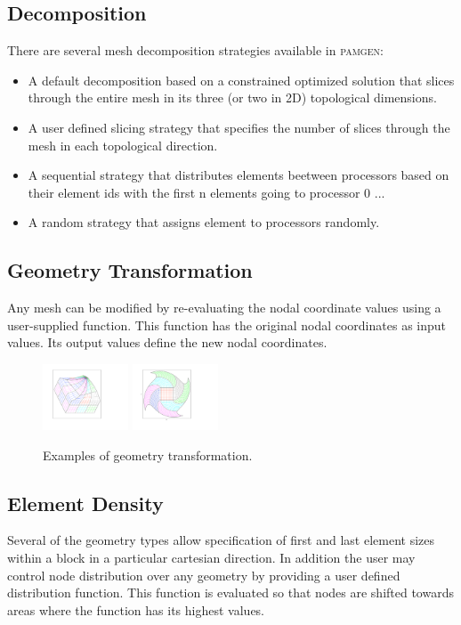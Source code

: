 \subsection{Decomposition}
There are several mesh decomposition strategies available in \textsc{pamgen}:
\begin{itemize}\addtolength{\itemsep}{-0.5\baselineskip}
\item A default decomposition based on a constrained optimized solution that slices through the entire mesh in its three (or two in 2D) topological dimensions.
\item A user defined slicing strategy that specifies the number of slices through the mesh in each topological direction.
\item A sequential strategy that distributes elements beetween processors based on their element ids with the first n  elements going to processor 0 ...
\item A random strategy that assigns element to processors randomly.
\end{itemize}

\subsection {Geometry Transformation}
Any mesh can be modified by re-evaluating the nodal coordinate values using a user-supplied function. This function has the original nodal coordinates as input values. Its output values define the new nodal coordinates.



\begin{figure}[h]
    \centering
      \includegraphics[width=1.0in]{3d_warped_geometry_white_bg}
      \includegraphics[width=1.0in]{mesh_warp_2d_white_bg}
  \caption{Examples of geometry transformation.}
  \label{fig:btm}
\end{figure}


\subsection{Element Density}
Several of the geometry types allow specification of first and last element sizes within a block in a particular cartesian direction. In addition the user may control node distribution over any geometry by providing a user defined distribution function. This function is evaluated so that nodes are shifted towards areas where the function has its highest values. 

